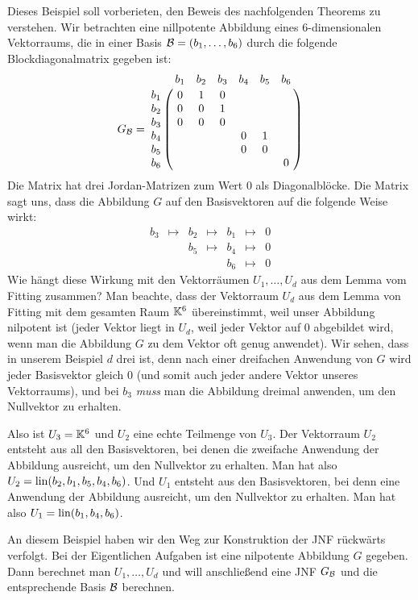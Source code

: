 \begin{bsp} Dieses Beispiel soll vorberieten, den Beweis des nachfolgenden Theorems zu verstehen. 
	Wir betrachten eine nillpotente Abbildung eines $6$-dimensionalen Vektorraums, die in einer Basis $ \mathcal{B} = (b_1, \ldots, b_6) $ durch die folgende Blockdiagonalmatrix gegeben ist: 
	\begin{equation*}
	G_\B = \bordermatrix{
		& b_1 & b_2 & b_3 & b_4 & b_5 & b_6 \cr
		b_1 &0&1&0&&& \cr
		b_2 &0&0&1&&& \cr
		b_3 &0&0&0&&& \cr
		b_4 &&&&0&1& \cr
		b_5 &&&&0&0& \cr
		b_6 &&&&&&0
	}
	\end{equation*}
	Die Matrix hat drei Jordan-Matrizen zum Wert $0$ als Diagonalblöcke. 
	Die Matrix sagt uns, dass die Abbildung $G$ auf den Basisvektoren auf die folgende Weise wirkt: 
	\begin{equation*}
		\begin{array}{ccccccc}
		b_3 & \mapsto & b_2 & \mapsto & b_1 & \mapsto & 0
		\\ && b_5 & \mapsto & b_4 & \mapsto & 0
		\\ && & & b_6 & \mapsto & 0
		\end{array}
	\end{equation*}
	Wie hängt diese Wirkung mit den Vektorräumen $U_1,\ldots,U_d$ aus dem Lemma vom Fitting zusammen? Man beachte, dass der Vektorraum $U_d$ aus dem Lemma von Fitting mit dem gesamten Raum $\mathbb K^6$ übereinstimmt, weil unser Abbildung nilpotent ist (jeder Vektor liegt in $U_d$, weil jeder Vektor auf $0$ abgebildet wird, wenn man die Abbildung $G$ zu dem Vektor oft genug anwendet). Wir sehen, dass in unserem Beispiel $d$ drei ist, denn nach einer dreifachen Anwendung von $G$ wird jeder Basisvektor gleich $0$ (und somit auch jeder andere Vektor unseres Vektorraums), und bei $b_3$ \emph{muss} man die Abbildung dreimal anwenden, um den Nullvektor zu erhalten. 
	
	Also ist $U_3 = \mathbb K^6$ und $U_2$ eine echte Teilmenge von $U_3$. Der Vektorraum $U_2$ entsteht aus all den Basisvektoren, bei denen die zweifache Anwendung der Abbildung ausreicht, um den Nullvektor zu erhalten. Man hat also $U_2 = \operatorname{lin}(b_2,b_1,b_5,b_4,b_6)$. Und $U_1$ entsteht aus den Basisvektoren, bei denn eine Anwendung der Abbildung ausreicht, um den Nullvektor zu erhalten. Man hat also $U_1 = \operatorname{lin}(b_1, b_4, b_6)$. 
	
	An diesem Beispiel haben wir den Weg zur Konstruktion der JNF rückwärts verfolgt. Bei der Eigentlichen Aufgaben ist eine nilpotente Abbildung $G$ gegeben. Dann berechnet man $U_1,\ldots,U_d$ und will anschließend eine JNF  $G_{\mathcal{B}}$ und die entsprechende Basis $\mathcal{B}$ berechnen. 
	

\end{bsp}
